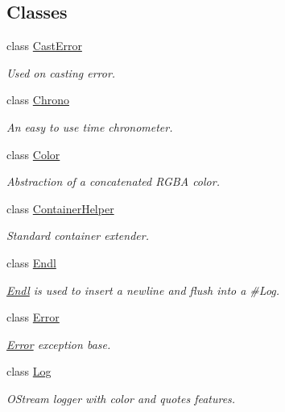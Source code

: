 \subsection*{Classes}
\begin{DoxyCompactItemize}
\item 
class \mbox{\hyperlink{classo_a_1_1_cast_error}{Cast\+Error}}
\begin{DoxyCompactList}\small\item\em Used on casting error. \end{DoxyCompactList}\item 
class \mbox{\hyperlink{classo_a_1_1_chrono}{Chrono}}
\begin{DoxyCompactList}\small\item\em An easy to use time chronometer. \end{DoxyCompactList}\item 
class \mbox{\hyperlink{classo_a_1_1_color}{Color}}
\begin{DoxyCompactList}\small\item\em Abstraction of a concatenated R\+G\+BA color. \end{DoxyCompactList}\item 
class \mbox{\hyperlink{classo_a_1_1_container_helper}{Container\+Helper}}
\begin{DoxyCompactList}\small\item\em Standard container extender. \end{DoxyCompactList}\item 
class \mbox{\hyperlink{classo_a_1_1_endl}{Endl}}
\begin{DoxyCompactList}\small\item\em \mbox{\hyperlink{classo_a_1_1_endl}{Endl}} is used to insert a newline and flush into a \#\+Log. \end{DoxyCompactList}\item 
class \mbox{\hyperlink{classo_a_1_1_error}{Error}}
\begin{DoxyCompactList}\small\item\em \mbox{\hyperlink{classo_a_1_1_error}{Error}} exception base. \end{DoxyCompactList}\item 
class \mbox{\hyperlink{classo_a_1_1_log}{Log}}
\begin{DoxyCompactList}\small\item\em O\+Stream logger with color and quotes features. \end{DoxyCompactList}\item 

\end{DoxyCompactItemize}
